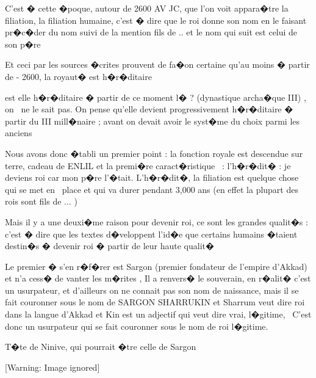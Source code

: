 \documentclass{article}
\begin{document}
\bigskip

C'est � cette �poque, autour de 2600 AV JC, que l'on voit appara�tre la filiation, la filiation humaine, c'est � dire que le roi donne son nom en le faisant pr�c�der du nom suivi de la mention {\textquotedbl} fils de .. {\textquotedbl} et le nom qui suit est celui de son p�re

Et ceci par les sources �crites prouvent de fa�on certaine qu'au moins � partir de - 2600, la royaut� est h�r�ditaire

est elle h�r�ditaire � partir de ce moment l� ? (dynastique archa�que III) , on \ ne le sait pas. On pense qu'elle devient progressivement h�r�ditaire � partir du III mill�naire ; avant on devait avoir le syst�me du choix parmi les anciens


\bigskip


\bigskip

Nous avons donc �tabli un premier point : la fonction royale est descendue sur terre, cadeau de ENLIL et la premi�re caract�ristique \ : l'h�r�dit� : je deviens roi car mon p�re l'�tait. L'h�r�dit�, la filiation est quelque chose qui se met en \ place et qui va durer pendant 3,000 ans (en effet la plupart des rois sont fils de ... )


\bigskip

Mais il y a une deuxi�me raison pour devenir roi, ce sont les grandes qualit�s : c'est � dire que les textes d�veloppent l'id�e que certains humains �taient destin�s � devenir roi � partir de leur haute qualit� 

Le premier � s'en r�f�rer est Sargon (premier fondateur de l'empire d'Akkad) et n'a cess� de vanter les m�rites , Il a renvers� le souverain, en r�alit� c'est un usurpateur, et d'ailleurs on ne connait pas son nom de naissance, mais il se fait couronner sous le nom de SARGON SHARRUKIN et Sharrum veut dire roi dans la langue d'Akkad et Kin est un adjectif qui veut dire vrai, l�gitime, \ C'est donc un usurpateur qui se fait couronner sous le nom de roi l�gitime.


\bigskip

T�te de Ninive, qui pourrait �tre celle de Sargon


\bigskip


\bigskip

  [Warning: Image ignored] %
 


\bigskip
\end{document}
